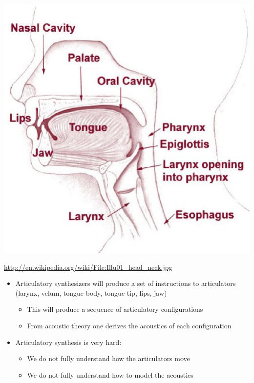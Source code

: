 \documentclass[a4paper,landscape,headrule,footrule,xetex]{foils}
\begin{document}
\begin{center}
  \noindent\includegraphics[height=0.8\textheight]{../pics/Illu01_head_neck.eps}
\end{center}

{\small \url{http://en.wikipedia.org/wiki/File:Illu01_head_neck.jpg}}

\begin{itemize}
\item Articulatory synthesizers will produce a set of instructions to articulators (larynx, velum, tongue body, tongue tip, lips, jaw)
  \begin{itemize}
  \item This will produce a sequence of articulatory configurations
  \item From acoustic theory one derives the acoustics of each configuration
  \end{itemize}
\item   Articulatory synthesis is very hard: 
  \begin{itemize}
  \item We do not fully understand how the articulators move
  \item We do not fully understand how to model the acoustics
  \end{itemize}
\end{itemize}
\end{document}

